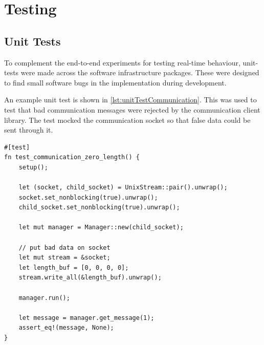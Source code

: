 \graphicspath{{main/implementation/graphics}}

\section{Testing}






\subsection{Unit Tests}

To complement the end-to-end experiments for testing real-time behaviour, unit-tests were made across the software infrastructure packages. These were designed to find small software bugs in the implementation during development.

An example unit test is shown in \autoref{lst:unitTestCommunication}. This was used to test that bad communication messages were rejected by the communication client library. The test mocked the communication socket so that false data could be sent through it.

\hfill

\begin{lstlisting}[caption=Example unit test (communications), label={lst:unitTestCommunication},captionpos=b]
#[test]
fn test_communication_zero_length() {
    setup();

    let (socket, child_socket) = UnixStream::pair().unwrap();
    socket.set_nonblocking(true).unwrap();
    child_socket.set_nonblocking(true).unwrap();

    let mut manager = Manager::new(child_socket);

    // put bad data on socket
    let mut stream = &socket;
    let length_buf = [0, 0, 0, 0];
    stream.write_all(&length_buf).unwrap();

    manager.run();

    let message = manager.get_message(1);
    assert_eq!(message, None);
}
\end{lstlisting}

